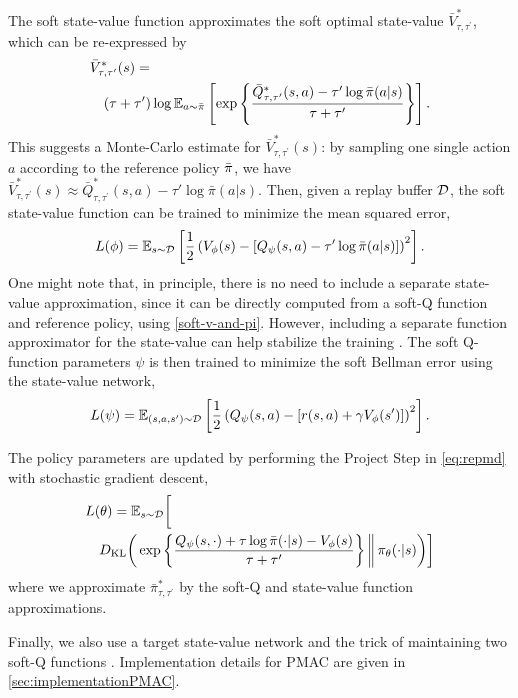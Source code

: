 The soft state-value function approximates the soft optimal state-value $\bar{V}_{\tau,\tau^{\prime}}^*$, which can be re-expressed by
{\small
\begin{align*}
\hspace{-0.3cm}
&\bar{V}_{\tau,\tau^{\prime}}^*(s) 
= \\
& \quad (\tau + \tau') \log \E _ {a\sim \refPi} \left[ \exp \left\{ \frac{\bar{Q}_{\tau,\tau^{\prime}}^*(s,a) - \tau' \log \bar{\pi}(a|s)} {\tau + \tau'} \right\} \right].
\end{align*}
}This suggests a Monte-Carlo estimate for
$\bar{V}_{\tau,\tau^{\prime}}^*(s)$:
by sampling one single action $a$ according to the reference policy $\bar{\pi}$,
we have $\bar{V}_{\tau,\tau^{\prime}}^*(s)
 \approx  \bar{Q}_{\tau,\tau^{\prime}}^*(s,a) - \tau' \log \bar{\pi}(a|s) $.
Then,
given a replay buffer ${\mathcal{D}}$,
the soft state-value function can be trained to minimize
the mean squared error,
%
{\small
\begin{equation*}
\label{eq:trainV}
L (\phi) = \mathbb{E}_{s\sim {\mathcal{D}}} \left[ \frac{1}{2} \left( V_{\phi}(s) -  \left[ Q_{\psi}(s,a ) - \tau' \log \bar{\pi}(a|s) \right] \right)^2 \right].
\end{equation*}
}One might note that, in principle, there is no need to include a 
separate state-value approximation, since it can be directly computed
from a soft-Q function and reference policy, 
using \cref{soft-v-and-pi}.
However, including a separate function approximator for the state-value
can help stabilize the training \citep{haarnoja2018soft}.
The soft Q-function parameters $\psi$ is then trained to minimize the soft Bellman error using the state-value network,
{\small
\begin{equation*}
\label{eq:trainQ}
L(\psi) = \mathbb{E}_{(s,a,s') \sim {\mathcal{D}}} \left[ \frac{1}{2} \left( Q_{\psi}(s,a) - \left[r(s,a) + \gamma V_{\phi}(s') \right] \right)^2 \right].
\end{equation*}
}

The policy parameters are updated by performing the Project Step in
\cref{eq:repmd} with stochastic gradient descent,
{\small
\begin{align*}
\label{eq:trainpi}
& L(\theta)  = \mathbb{E}_{s \sim {\mathcal{D}}} \bigg[ \\
& \quad D_{\mathrm{KL}} \bigg( \exp\left\{ \frac{Q_{\psi}(s,\cdot) + \tau \log \bar{\pi}(\cdot|s) - V_{\phi}(s)}{\tau+\tau'} \right\}  \bigg\Vert\, \pi_{\theta}(\cdot |s) \bigg) \bigg]
\end{align*}
}where we approximate $\bar{\pi}_{\tau,\tau^{\prime}}^*$ by the soft-Q and state-value function approximations. 

Finally,
we also use a target state-value network \citep{lillicrap2015continuous}
and the trick of maintaining two soft-Q functions
\citep{haarnoja2018soft,fujimoto2018addressing}.
Implementation details for PMAC are given in \cref{sec:implementationPMAC}. 


